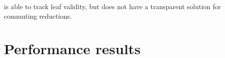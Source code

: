 \documentclass[thesis]{subfiles}
\begin{document}

 is able to track leaf validity, but does not have a transparent solution for commuting reductions.


\section{Performance results}

\end{document}
